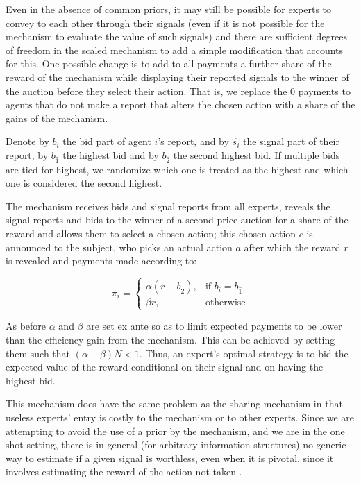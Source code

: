 Even in the absence of common priors, it may still be possible for experts to convey to each other through their signals (even if it is not possible for the mechanism to evaluate the value of such signals) and there are sufficient degrees of freedom in the scaled mechanism to add a simple modification that accounts for this.
One possible change is to add to all payments a further share of the reward of the mechanism while displaying their reported signals to the winner of the auction before they select their action. That is, we replace the 0 payments to agents that do not make a report that alters the chosen action with a share of the gains of the mechanism.

Denote by $b_i$ the bid part of agent $i$'s report, and by $\hat{s_i}$ the signal part of their report, by $b_{\hat{1}}$ the highest bid and by $b_{\hat{2}}$ the second highest bid. If multiple bids are tied for highest, we randomize which one is treated as the highest and which one is considered the second highest.

\begin{mech}
The mechanism receives bids and signal reports from all experts, reveals the signal reports and bids to the winner of a second price auction for a share of the reward and allows them to select a chosen action; this chosen action $c$ is announced to the subject, who picks an actual action $a$ after which the reward $r$ is revealed and payments made according to:

\[
    \pi_i = 
\begin{cases}
    \alpha (r - b_{\hat{2}} ) ,& \text{if } b_i = b_{\hat{1}}\\
    \beta r,              & \text{otherwise}
\end{cases}
\]

\end{mech}

As before $\alpha$ and $\beta$ are set ex ante so as to limit expected payments to be lower than the efficiency gain from the mechanism. This can be achieved by setting them such that $(\alpha + \beta)N < 1$.
Thus, an expert's optimal strategy is to bid the expected value of the reward conditional on their signal and on having the highest bid.

This mechanism does have the same problem as the sharing mechanism in that useless experts' entry is costly to the mechanism or to other experts.
Since we are attempting to avoid the use of a prior by the mechanism, and we are in the one shot setting, there is in general (for arbitrary information structures) no generic way to estimate if a given signal is worthless, even when it is pivotal, since it involves estimating the reward of the action not taken \cite{della2012crowd,waggoner2014output, witkowski2014robust}.



